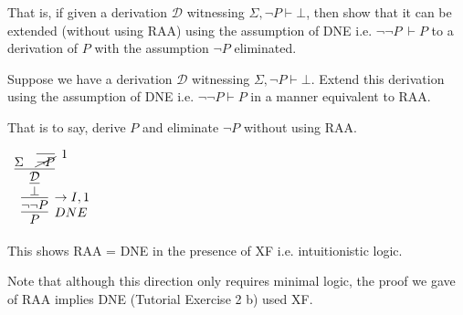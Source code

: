 \documentclass[11pt]{report}
\begin{document}
\begin{enumerate}
\begin{enumerate}

			That is, if given a derivation $\mathcal{D}$ witnessing $\Sigma,\lnot P \vdash \bot$, then show that it can be extended (without using RAA) using the assumption of DNE i.e. $\lnot \lnot P \ \vdash P$ to a derivation of $P$ with the assumption $\lnot P$ eliminated.

			\hspace{0.2cm}{\bf Solution}

			Suppose we have a derivation $\mathcal{D}$ witnessing $\Sigma,\lnot P \vdash \bot$. Extend this derivation using the assumption of DNE i.e. $\lnot \lnot P \vdash P$ in a manner equivalent to RAA. 

			That is to say, derive $P$ and eliminate $\lnot P$ without using RAA. 

			\begin{mdframed}
				\begin{center}
					$\begin{array}{c}
						\infer[DNE]{P}
							{\infer[\to I,1]{\lnot \lnot P}
								{\infer[]{\bot}
									{\infer[]{\mathcal{D}}	
										{\Sigma & \infer[1]{\cancel{\lnot P}}{}}}}}
					\end{array}$
				\end{center}
			\end{mdframed}

			This shows RAA = DNE in the presence of XF i.e. intuitionistic logic. 

			Note that although this direction only requires minimal logic, the proof we gave of RAA implies DNE (Tutorial Exercise 2 b) used XF. 




		\end{enumerate}

	\end{enumerate}	
\end{document}
